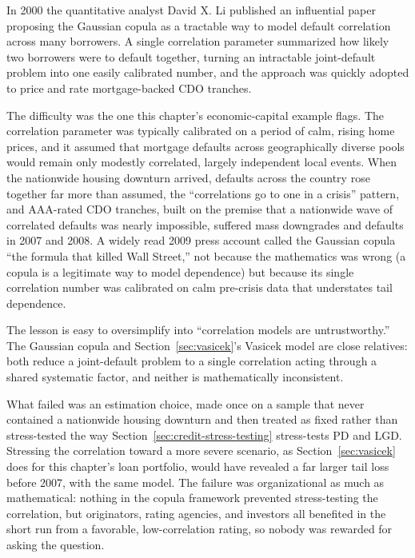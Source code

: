 \documentclass[../ai_in_finance]{subfiles}
\begin{document}
In 2000 the quantitative analyst David X. Li published an influential paper proposing the Gaussian copula as a tractable way to model default correlation across many borrowers. A single correlation parameter summarized how likely two borrowers were to default together, turning an intractable joint-default problem into one easily calibrated number, and the approach was quickly adopted to price and rate mortgage-backed CDO tranches.

The difficulty was the one this chapter's economic-capital example flags. The correlation parameter was typically calibrated on a period of calm, rising home prices, and it assumed that mortgage defaults across geographically diverse pools would remain only modestly correlated, largely independent local events. When the nationwide housing downturn arrived, defaults across the country rose together far more than assumed, the ``correlations go to one in a crisis'' pattern, and AAA-rated CDO tranches, built on the premise that a nationwide wave of correlated defaults was nearly impossible, suffered mass downgrades and defaults in 2007 and 2008.
A widely read 2009 press account called the Gaussian copula ``the formula that killed Wall Street,'' not because the mathematics was wrong (a copula is a legitimate way to model dependence) but because its single correlation number was calibrated on calm pre-crisis data that understates tail dependence.

The lesson is easy to oversimplify into ``correlation models are untrustworthy.'' The Gaussian copula and Section~\ref{sec:vasicek}'s Vasicek model are close relatives: both reduce a joint-default problem to a single correlation acting through a shared systematic factor, and neither is mathematically inconsistent.

What failed was an estimation choice, made once on a sample that never contained a nationwide housing downturn and then treated as fixed rather than stress-tested the way Section~\ref{sec:credit-stress-testing} stress-tests PD and LGD. Stressing the correlation toward a more severe scenario, as Section~\ref{sec:vasicek} does for this chapter's loan portfolio, would have revealed a far larger tail loss before 2007, with the same model.
The failure was organizational as much as mathematical: nothing in the copula framework prevented stress-testing the correlation, but originators, rating agencies, and investors all benefited in the short run from a favorable, low-correlation rating, so nobody was rewarded for asking the question.
\end{document}
